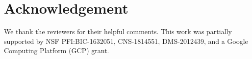 \documentclass{article}
\newcommand{\Luyang}[1]{\textcolor{orange}{(Luyang: #1)}}
\begin{document}
 
\vspace{-2mm}


\section{Acknowledgement}
\label{sec.ack}
\vspace{-2mm}
\noindent
We thank the reviewers for their helpful comments. 
This work was partially supported by NSF PFI:BIC-1632051, CNS-1814551, DMS-2012439, and a Google Computing Platform (GCP) grant. 

%




%
%



\end{document}
